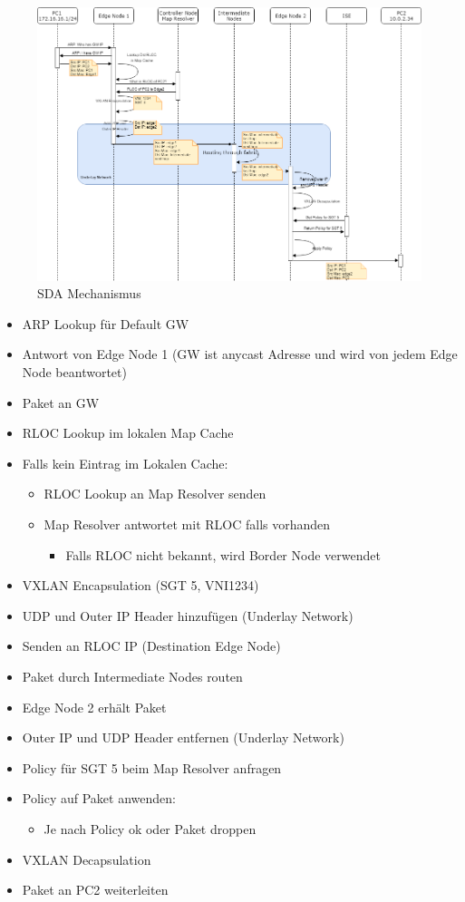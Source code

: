 \begin{figure}[H]
	\centering
	\includegraphics[width=16cm]{img/SDA_Mechanismus-NewVersion.png}
	\caption{SDA Mechanismus}
	\label{fig:SDA Mechanismus}
\end{figure}
\begin{itemize}
	\item ARP Lookup für Default GW
	\item Antwort von Edge Node 1 (GW ist anycast Adresse und wird von jedem Edge Node beantwortet)
	\item Paket an GW
	\item RLOC Lookup im lokalen Map Cache
	\item Falls kein Eintrag im Lokalen Cache:
	\begin{itemize}
		\item RLOC Lookup an Map Resolver senden
		\item Map Resolver antwortet mit RLOC falls vorhanden
		\begin{itemize}
			\item Falls RLOC nicht bekannt, wird Border Node verwendet 
		\end{itemize} 
	\end{itemize}
	\item VXLAN Encapsulation (SGT 5, VNI1234)
	\item UDP und Outer IP Header hinzufügen (Underlay Network)
	\item Senden an RLOC IP (Destination Edge Node)
	\item Paket durch Intermediate Nodes routen
	\item Edge Node 2 erhält Paket
	\item Outer IP und UDP Header entfernen (Underlay Network)
	\item Policy für SGT 5 beim Map Resolver anfragen
	\item Policy auf Paket anwenden:
	\begin{itemize}
		\item Je nach Policy ok oder Paket droppen
	\end{itemize}
	\item VXLAN Decapsulation
	\item Paket an PC2 weiterleiten
\end{itemize}


